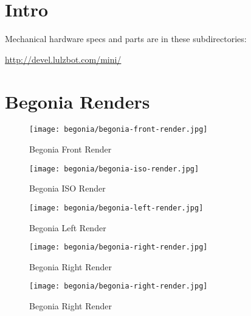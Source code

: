 %
%
%
%
%

\section{Intro}
Mechanical hardware specs and parts are in these subdirectories:

\url{http://devel.lulzbot.com/mini/}

\section{Begonia Renders}

\begin{figure}[H]
\centering
\texttt{[image: begonia/begonia-front-render.jpg]}
\caption{Begonia Front Render}
\label{fig:begfrontrender}
\end{figure}

\begin{figure}[H]
\centering
\texttt{[image: begonia/begonia-iso-render.jpg]}
\caption{Begonia ISO Render}
\label{fig:begisorender}
\end{figure}

\begin{figure}[H]
\centering
\texttt{[image: begonia/begonia-left-render.jpg]}
\caption{Begonia Left Render}
\label{fig:begleftrender}
\end{figure}

\begin{figure}[H]
\centering
\texttt{[image: begonia/begonia-right-render.jpg]}
\caption{Begonia Right Render}
\label{fig:begrightrender}
\end{figure}

\begin{figure}[H]
\centering
\texttt{[image: begonia/begonia-right-render.jpg]}
\caption{Begonia Right Render}
\label{fig:begrightrender}
\end{figure}

